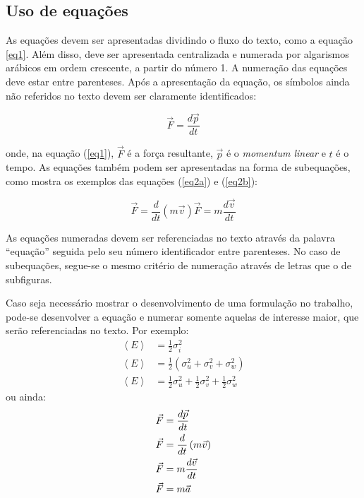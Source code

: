\documentclass[]{workmicro2019} %
\begin{document}
\subsection{Uso de equações}

\par As equações devem ser apresentadas dividindo o fluxo do texto, como a equação \ref{eq1}. Além disso, deve ser apresentada centralizada e numerada por algarismos arábicos em ordem crescente, a partir do número 1. A numeração das equações deve estar entre parenteses. Após a apresentação da equação, os símbolos ainda não referidos no texto devem ser claramente identificados:

\begin{equation}
\label{eq1}
\vec{F}=\frac{d\vec{p}}{dt}
\end{equation}

\noindent onde, na equação (\ref{eq1}), $\vec{F}$ é a força resultante, $\vec{p}$ é o \textit{momentum linear} e $t$  é o tempo. As equações também podem ser apresentadas na forma de subequações, como mostra os exemplos das equações (\ref{eq2a}) e (\ref{eq2b}):

\begin{subequations}
\begin{equation}
\label{eq2a}
\vec{F}=\frac{d}{dt}\left(m\vec{v}\right)
\end{equation}

\begin{equation}
\label{eq2b}
\vec{F}=m\frac{d\vec{v}}{dt}
\end{equation}
\end{subequations}

\par As equações numeradas devem ser referenciadas no texto através da palavra ``equação'' seguida pelo seu número identificador entre parenteses. No caso de subequações, segue-se o mesmo critério de numeração através de letras que o de subfiguras.

\par Caso seja necessário mostrar o desenvolvimento de uma formulação no trabalho, pode-se desenvolver a equação e numerar somente aquelas de interesse maior, que serão referenciadas no texto. Por exemplo:
{\allowdisplaybreaks
\begin{align}
\left<E\right>&=\frac{1}{2}\sigma_i^2\\
\left<E\right>&=\frac{1}{2}\left(\sigma_u^2+\sigma_v^2+\sigma_w^2\right)\nonumber\\
\left<E\right>&=\frac{1}{2}\sigma_u^2+\frac{1}{2}\sigma_v^2+\frac{1}{2}\sigma_w^2
\end{align}}
\noindent ou ainda:
\begin{subequations}
{\allowdisplaybreaks
\begin{align}
\vec{F}&=\frac{d\vec{p}}{dt}\nonumber\\
\vec{F}&=\frac{d}{dt}\left(m\vec{v}\right)\nonumber\\
\vec{F}&=m\frac{d\vec{v}}{dt}\\
\vec{F}&=m\vec{a}
\end{align}}
\end{subequations}
\end{document}
